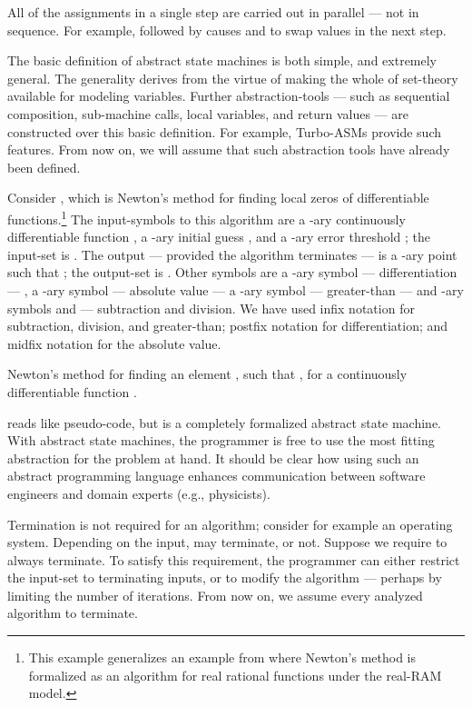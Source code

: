 \documentclass[b5paper, english, oneside]{memoir}
\begin{document}
All of the assignments in a single step are carried out in parallel --- not in sequence. For example,  followed by  causes  and  to swap values in the next step.

The basic definition of abstract state machines is both simple, and extremely general. The generality derives from the virtue of making the whole of set-theory available for modeling variables. Further abstraction-tools --- such as sequential composition, sub-machine calls, local variables, and return values --- are constructed over this basic definition. For example, Turbo-ASMs \cite{ASMBook} provide such features. From now on, we will assume that such abstraction tools have already been defined.

Consider , which is Newton's method for finding local zeros of differentiable functions.\footnote{This example generalizes an example from \cite{RealRam} where Newton's method is formalized as an algorithm for real rational functions under the real-RAM model.} The input-symbols to this algorithm are a -ary continuously differentiable function , a -ary initial guess , and a -ary error threshold ; the input-set is . The output --- provided the algorithm terminates --- is a -ary point  such that ; the output-set is . Other symbols are a -ary symbol  --- differentiation  --- , a -ary symbol  --- absolute value --- a -ary symbol  --- greater-than --- and -ary symbols  and  --- subtraction and division. We have used infix notation for subtraction, division, and greater-than; postfix notation for differentiation; and midfix notation for the absolute value.

\begin{algorithm}
\caption{Newton's method for finding an element , such that , for a continuously differentiable function .}
\label{alg:FindZero}
\begin{algorithmic}[1]
\State 
\While {}
  \State 
\EndWhile
\State \Return 
\EndProcedure
\end{algorithmic}
\end{algorithm}

 reads like pseudo-code, but is a completely formalized abstract state machine. With abstract state machines, the programmer is free to use the most fitting abstraction for the problem at hand. It should be clear how using such an abstract programming language enhances communication between software engineers and domain experts (e.g., physicists). 

Termination is not required for an algorithm; consider for example an operating system. Depending on the input,  may terminate, or not. Suppose we require  to always terminate. To satisfy this requirement, the programmer can either restrict the input-set to terminating inputs, or to modify the algorithm --- perhaps by limiting the number of iterations. From now on, we assume every analyzed algorithm to terminate.
\end{document}
